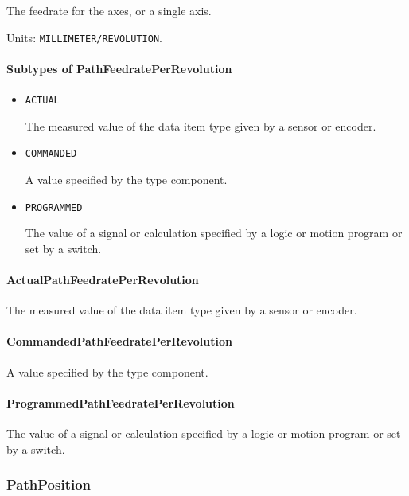 The feedrate for the axes, or a single axis.


Units: \texttt{MILLIMETER/REVOLUTION}.

\paragraph{Subtypes of PathFeedratePerRevolution}\mbox{}
\label{sec:Subtypes of PathFeedratePerRevolution}

\begin{itemize}

\item \texttt{ACTUAL}


The measured value of the data item type given by a sensor or encoder.

\item \texttt{COMMANDED}


A value specified by the  type component.

\item \texttt{PROGRAMMED}


The value of a signal or calculation specified by a logic or motion program or set by a switch.


\end{itemize}

\paragraph{ActualPathFeedratePerRevolution}\mbox{}
\label{sec:ActualPathFeedratePerRevolution}


The measured value of the data item type given by a sensor or encoder.


\paragraph{CommandedPathFeedratePerRevolution}\mbox{}
\label{sec:CommandedPathFeedratePerRevolution}


A value specified by the  type component.


\paragraph{ProgrammedPathFeedratePerRevolution}\mbox{}
\label{sec:ProgrammedPathFeedratePerRevolution}


The value of a signal or calculation specified by a logic or motion program or set by a switch.


\subsubsection{PathPosition}
\label{sec:PathPosition}



